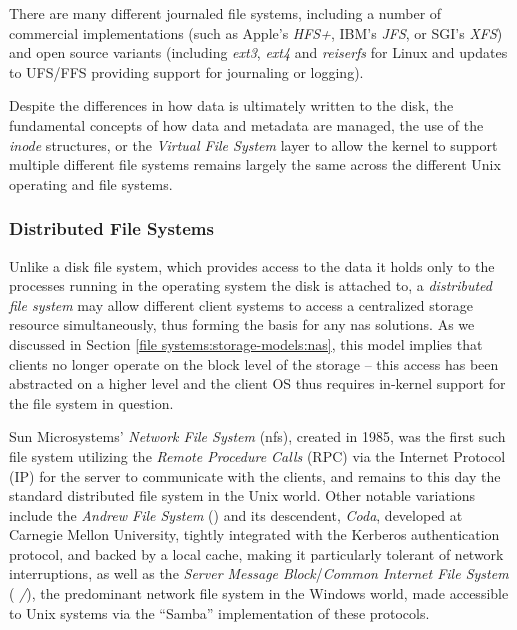 There are many different journaled file systems,
including a number of commercial implementations (such
as Apple's {\em HFS+}, IBM's
{\em JFS}, or SGI's {\em
XFS}) and open source variants
(including {\em ext3}, {\em ext4} and {\em
reiserfs} for Linux and
updates to UFS/FFS providing support for journaling or
logging).

Despite the differences in how data is ultimately
written to the disk, the fundamental concepts of how
data and metadata are managed, the use of the {\em
inode} structures, or the {\em Virtual File System}
layer to allow the kernel to support multiple
different file systems remains largely the same across
the different Unix operating and file systems.

\subsubsection{Distributed File Systems}

Unlike a disk file system, which provides access to
the data it holds only to the processes running in the
operating system the disk is attached to, a {\em
distributed file system} may allow different client
systems to access a centralized storage resource
simultaneously, thus forming the basis for any
\gls{nas} solutions.  As we discussed in Section
\ref{file systems:storage-models:nas}, this model
implies that clients no longer operate on the block
level of the storage -- this access has been
abstracted on a higher level and the client OS thus
requires in-kernel support for the file system in
question.

Sun Microsystems' {\em Network
File System} (\gls{nfs}),
created in 1985, was the first such file system
utilizing the {\em Remote Procedure
Calls} (RPC) via the
Internet Protocol (IP) for the server to communicate with the
clients, and remains to this day the standard
distributed file system in the Unix world.  Other
notable variations include the {\em Andrew File
System} () and its descendent, {\em Coda},
developed at Carnegie Mellon University, tightly integrated with the
Kerberos authentication protocol, and
backed by a local cache, making it particularly
tolerant of network interruptions, as well as the {\em
Server Message Block}/{\em Common Internet File
System} ({\em
{}/}), the
predominant network file system in the Windows world,
made accessible to Unix systems via the
``Samba'' implementation of these
protocols.

